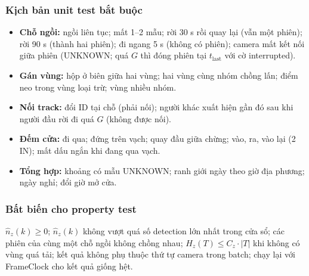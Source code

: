 \documentclass[10pt,a4paper,oneside,openany]{report}
\newcommand{\breakus}{\textunderscore\allowbreak}
\newcommand{\code}[1]{{\ttfamily\let\_\breakus #1}}
\begin{document}
\subsubsection{Kịch bản unit test bắt buộc}
\begin{itemize}
  \item \textbf{Chỗ ngồi:} ngồi liên tục; mất 1--2 mẫu; rời 30 s rồi quay lại (vẫn một phiên); rời 90 s (thành hai phiên); đi ngang 5 s (không có phiên);
        camera mất kết nối giữa phiên (\code{UNKNOWN}; quá $G$ thì đóng phiên tại $t_{\text{last}}$ với cờ \code{interrupted}).
  \item \textbf{Gán vùng:} hộp ở biên giữa hai vùng; hai vùng cùng nhóm chồng lấn; điểm neo trong vùng loại trừ; vùng nhiều nhóm.
  \item \textbf{Nối track:} đổi ID tại chỗ (phải nối); người khác xuất hiện gần đó sau khi người đầu rời đi quá $G$ (không được nối).
  \item \textbf{Đếm cửa:} đi qua; đứng trên vạch; quay đầu giữa chừng; vào, ra, vào lại (2 IN); mất dấu ngắn khi đang qua vạch.
  \item \textbf{Tổng hợp:} khoảng có mẫu \code{UNKNOWN}; ranh giới ngày theo giờ địa phương; ngày nghỉ; đổi giờ mở cửa.
\end{itemize}

\subsubsection{Bất biến cho property test}
$\hat n_z(k) \ge 0$; $\hat n_z(k)$ không vượt quá số detection lớn nhất trong cửa sổ; các phiên của cùng một chỗ ngồi không chồng nhau;
$H_z(T) \le C_z \cdot |T|$ khi không có vùng quá tải; kết quả không phụ thuộc thứ tự camera trong batch; chạy lại với \code{FrameClock}
cho kết quả giống hệt.
\end{document}
